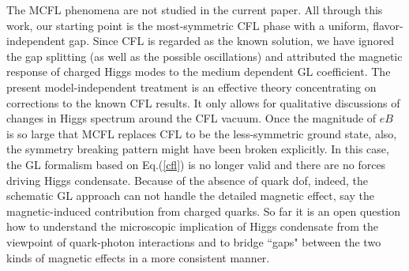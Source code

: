 \documentclass[12pt]{article}
\begin{document}
%
The MCFL phenomena are not studied in the current paper. All through this work, our starting point is the most-symmetric CFL phase with a uniform, flavor-independent gap.
Since CFL is regarded as the known solution, we have ignored the gap splitting (as well as the possible oscillations) and attributed the magnetic response of charged Higgs modes to the medium dependent GL coefficient.
The present model-independent treatment is an effective theory concentrating on corrections to the known CFL results. It only allows for qualitative discussions of changes in Higgs spectrum around the CFL vacuum.
Once the magnitude of $eB$ is so large that MCFL replaces CFL to be the less-symmetric ground state, also, the symmetry breaking pattern might have been broken explicitly. In this case, the GL formalism based on Eq.(\ref{cfl}) is no longer valid and there are no forces driving Higgs condensate.
Because of the absence of quark dof, indeed, the schematic GL approach can not handle the detailed magnetic effect, say the magnetic-induced contribution from charged quarks.
% 
So far it is an open question how to understand the microscopic implication of Higgs condensate from the viewpoint of 
quark-photon interactions and to bridge ``gaps" between the two kinds of magnetic effects in a more consistent manner.
\end{document}
